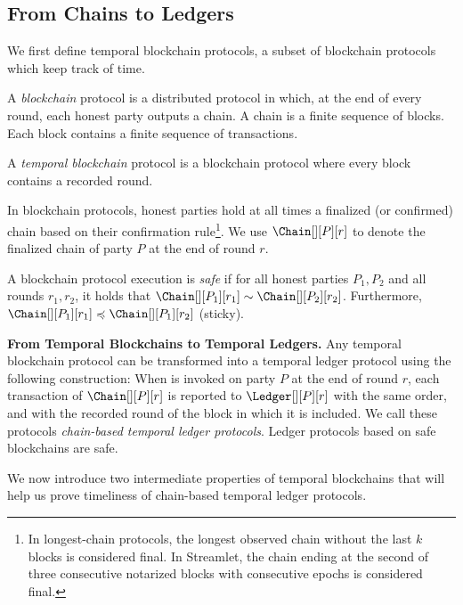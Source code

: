 \subsection{From Chains to Ledgers}

We first define temporal blockchain protocols,
a subset of blockchain protocols~\cite{rethinking-consensus}
which keep track of time.

\begin{definition}
  A \emph{blockchain} protocol is a distributed protocol
  in which, at the end of every round, each honest party outputs
  a chain. A chain is a finite sequence of blocks. Each block
  contains a finite sequence of transactions.

  A \emph{temporal blockchain} protocol is a blockchain protocol
  where every block contains a recorded round.
\end{definition}

In blockchain protocols, honest parties hold at all times a finalized (or confirmed) chain
based on their confirmation rule\footnote{
  In longest-chain protocols, the longest observed chain without the last $k$ blocks
  is considered final.
  In Streamlet, the chain ending at the second of three consecutive notarized
  blocks with consecutive epochs is considered final.
}.
We use $\Chain[][P][r]$ to denote the finalized chain
of party $P$ at the end of round $r$.

\begin{definition}
  A blockchain protocol execution is \emph{safe} if for
  all honest parties $P_1, P_2$ and all rounds $r_1, r_2$,
  it holds that $\Chain[][P_1][r_1] \sim \Chain[][P_2][r_2]$.
  Furthermore, $\Chain[][P_1][r_1] \preccurlyeq \Chain[][P_1][r_2]$ (sticky).
\end{definition}

\noindent
\textbf{From Temporal Blockchains to Temporal Ledgers.}
Any temporal blockchain protocol can be transformed into a
temporal ledger protocol using the following construction:
When \rread is invoked on party $P$ at the end of round $r$, each transaction of
$\Chain[][P][r]$ is reported to $\Ledger[][P][r]$ with the same order, and with
the recorded round of the block in which it is included.
We call these protocols \emph{chain-based temporal ledger protocols}.
Ledger protocols based on safe blockchains are safe.

We now introduce two intermediate properties of temporal blockchains
that will help us prove timeliness of
chain-based temporal ledger protocols.

